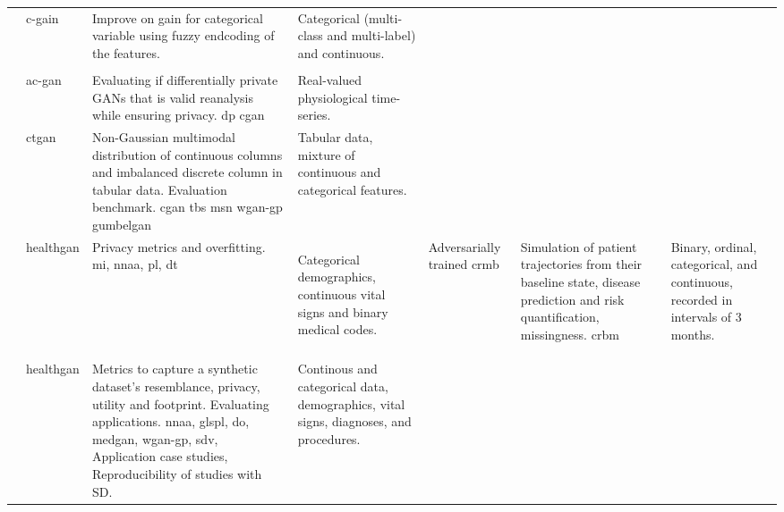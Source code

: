 \begin{sidewaystable}[htbp]
\begin{tabularx}{\textwidth}{@{}p{4cm}XXX@{}}
            
            \cite{Yang_2019_impute_ehr}
            & \gls{c-gain}
            & Improve on \gls{gain} for categorical variable using fuzzy endcoding of the features. 
            & Categorical (multi-class and multi-label) and continuous.\\
            
            \cite{rubanova2019latent}
            & 
            & 
            &\\
            
            \cite{Beaulieu-Jones2019-ct}
            & \gls{ac-gan} 
            & Evaluating if differentially private GANs that is valid reanalysis while ensuring privacy. \gls{dp} \gls{cgan}
            & Real-valued physiological time-series.\\
            
            \cite{Xu2019-ay}
            & \gls{ctgan}
            & Non-Gaussian multimodal distribution of continuous columns and imbalanced discrete column in tabular data. Evaluation benchmark. \gls{cgan} \gls{tbs} \gls{msn} \gls{wgan-gp} \gls{gumbelgan}
            & Tabular data, mixture of continuous and categorical features.\\
            
            
            \cite{yale2019ESANN}
            & \gls{healthgan}
            & Privacy metrics and overfitting. \gls{mi}, \gls{nnaa}, \gls{pl}, \gls{dt}
            & Categorical demographics, continuous vital signs and binary medical codes.
            
            \cite{Fisher2019} \cite{walsh2020generating}
            & Adversarially trained \gls{crmb}
            & Simulation of patient trajectories from their baseline state, disease prediction and risk quantification, missingness. \gls{crbm}
            &  Binary, ordinal, categorical, and continuous, recorded in intervals of 3 months.\\
            
            
            & 
            & 
            &\\
            
            \cite{Yale_2020}
            & \gls{healthgan}
            & Metrics to capture a synthetic dataset’s resemblance, privacy, utility and footprint. Evaluating applications. \gls{nnaa}, gls{pl}, \gls{do}, \gls{medgan}, \gls{wgan-gp}, \gls{sdv}, Application case studies, Reproducibility of studies with \gls{SD}.
            & Continous and categorical data, demographics, vital signs, diagnoses, and procedures.\\
            

\end{tabularx}
\end{sidewaystable}
